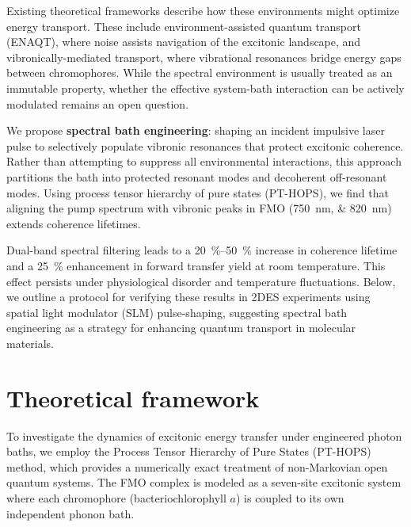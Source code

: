 \documentclass[journal=jpcl,manuscript=letter]{achemso}
\begin{document}
Existing theoretical frameworks describe how these environments might optimize energy transport. These include environment-assisted quantum transport (ENAQT), where noise assists navigation of the excitonic landscape,\cite{Mohseni2008,Rebentrost2009} and vibronically-mediated transport, where vibrational resonances bridge energy gaps between chromophores.\cite{Chin2013,Huelga2013} While the spectral environment is usually treated as an immutable property, whether the effective system-bath interaction can be actively modulated remains an open question.

We propose \textbf{spectral bath engineering}: shaping an incident impulsive laser pulse to selectively populate vibronic resonances that protect excitonic coherence. Rather than attempting to suppress all environmental interactions, this approach partitions the bath into protected resonant modes and decoherent off-resonant modes. Using process tensor hierarchy of pure states (PT-HOPS),\cite{Citty2024a} we find that aligning the pump spectrum with vibronic peaks in FMO (\SIlist{750;820}{\nano\meter}) extends coherence lifetimes.

Dual-band spectral filtering leads to a \SIrange{20}{50}{\percent} increase in coherence lifetime and a \SI{25}{\percent} enhancement in forward transfer yield at room temperature. This effect persists under physiological disorder and temperature fluctuations. Below, we outline a protocol for verifying these results in 2DES experiments using spatial light modulator (SLM) pulse-shaping, suggesting spectral bath engineering as a strategy for enhancing quantum transport in molecular materials.


\section{Theoretical framework}

To investigate the dynamics of excitonic energy transfer under engineered photon baths, we employ the Process Tensor Hierarchy of Pure States (PT-HOPS) method,\cite{Suess2014,Citty2024a} which provides a numerically exact treatment of non-Markovian open quantum systems. The FMO complex is modeled as a seven-site excitonic system where each chromophore (bacteriochlorophyll $a$) is coupled to its own independent phonon bath.
\end{document}
